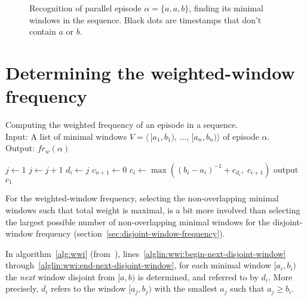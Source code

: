 \begin{figure}

\caption{Recognition of parallel episode $ \alpha = \{ a, a, b \} $, finding its minimal windows in the sequence. Black dots are timestamps that don't contain $ a $ or $ b $.}
\label{fig:parallel-minimal-recognition}
\end{figure}

\section{Determining the weighted-window frequency}

\begin{algorithm}

\caption{Computing the weighted frequency of an episode in a sequence.\\
Input: A list of minimal windows $ V = \langle \, [a_1, b_1), \, \ldots, \, [a_n, b_n) \rangle $ of episode $ \alpha $.\\
Output: $ fr_w(\alpha) $
}

\begin{algorithmic}[1]

\State $ j \gets 1 $
\ForAll {$ [a_i, b_i) \in V $} \label{alglin:wwi:begin-next-disjoint-window}
        \State $ j \gets j + 1 $
    \EndWhile
    \State $ d_i \gets j $ \label{alglin:wwi:end-next-disjoint-window}
\EndFor
\State $ c_{n + 1} \gets 0 $ \label{alglin:wwi:begin-wwi-calculation}
    \State $ c_i \gets \max((b_i - a_i)^{-1} + c_{d_i}, \; c_{i+1}) $ \label{alglin:wwi:end-wwi-calculation}
\EndFor
\State output $ c_1 $

\end{algorithmic}

\label{alg:wwi}
\end{algorithm}

For the weighted-window frequency, selecting the non-overlapping minimal windows such that total weight is maximal, is a bit more involved than selecting the largest possible number of non-overlapping minimal windows for the disjoint-window frequency (section~\ref{sec:disjoint-window-frequency}).

In algorithm~\ref{alg:wwi} (from~\cite{cule2014marbles}), lines~\ref{alglin:wwi:begin-next-disjoint-window} through~\ref{alglin:wwi:end-next-disjoint-window}, for each minimal window $ [a_i, b_i) $ the \emph{next} window disjoint from $ [a, b) $ is determined, and referred to by $ d_i $. More precisely, $ d_i $ refers to the window $ [a_j, b_j) $ with the smallest $ a_j $ such that $ a_j \geq b_i $.

